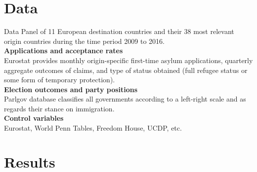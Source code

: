 \documentclass{beamer}
\begin{document}
	
\section{Data}
	\begin{frame}{Data}
Panel of 11 European destination countries and their 38 most relevant origin countries during the time period 2009
to 2016.\\\vspace{.4cm}	
\textbf{Applications and acceptance rates}\\\vspace{.2cm}
Eurostat provides monthly origin-specific first-time asylum applications, quarterly aggregate outcomes of claims, and type of status obtained
(full refugee status or some form of temporary protection).\\\vspace{.4cm}
\textbf{Election outcomes and party positions}\\\vspace{.2cm}
Parlgov database classifies all governments according to a left-right scale and as regards their stance on immigration.\\\vspace{.4cm}
\textbf{Control variables}\\\vspace{.2cm}
Eurostat, World Penn Tables, Freedom House, UCDP, etc.
	\end{frame}

\section{Results}
\end{document}
